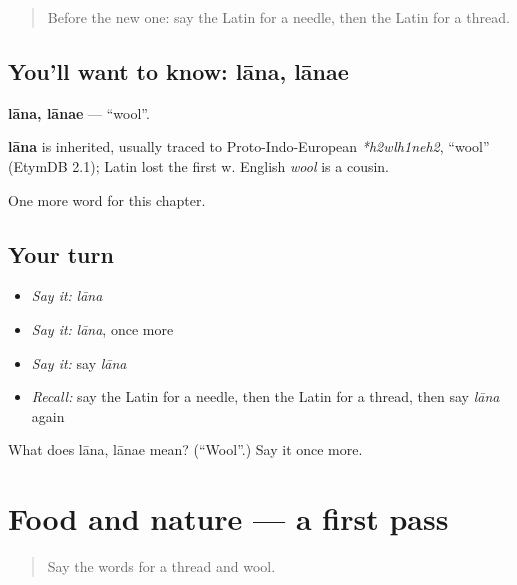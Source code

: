 \begin{quote}
Before the new one: say the Latin for a needle, then the Latin for a thread.
\end{quote}

\subsection*{You'll want to know: lāna, lānae}
\textbf{lāna, lānae} — \textquotedblleft{}wool\textquotedblright{}.

\begin{cousinweb}
\textbf{lāna} is inherited, usually traced to Proto-Indo-European \emph{*h2wlh1neh2}, \textquotedblleft{}wool\textquotedblright{} (EtymDB 2.1); Latin lost the first w. English \emph{wool} is a cousin.
\end{cousinweb}

\begin{grammarlens}[title={What you've built}]
One more word for this chapter.
\end{grammarlens}

\subsection*{Your turn}
\begin{itemize}
\raggedright
  \item \emph{Say it:} \emph{lāna}
  \item \emph{Say it:} \emph{lāna}, once more
  \item \emph{Say it:} say \emph{lāna}
  \item \emph{Recall:} say the Latin for a needle, then the Latin for a thread, then say \emph{lāna} again
\end{itemize}

\begin{tcolorbox}[breakable,colback=teal!4,colframe=teal!35!black,title={Before you move on}]
What does lāna, lānae mean? (\textquotedblleft{}Wool\textquotedblright{}.) Say it once more.
\end{tcolorbox}
\section[(dialogue)]{Food and nature — a first pass}

\label{lesson:LA-R140-first-pass-food-and-nature}



\begin{quote}
Say the words for a thread and wool.
\end{quote}

